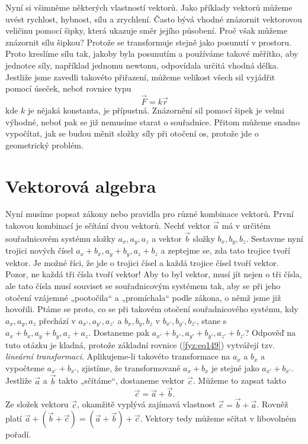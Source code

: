     Nyní si všimněme některých vlastností vektorů. Jako příklady vektorů můžeme uvést rychlost, 
    hybnost, sílu a zrychlení. Často bývá vhodné znázornit vektorovou veličinu pomocí šipky, která 
    ukazuje směr jejího působení. Proč však můžeme znázornit sílu šipkou? Protože se transformuje 
    stejně jako posunutí v prostoru. Proto kreslíme sílu tak, jakoby byla posunutím a používáme 
    takové měřítko, aby jednotce síly, například jednomu newtonu, odpovídala určitá vhodná délka. 
    Jestliže jsme zavedli takovéto přiřazení, můžeme velikost všech sil vyjádřit pomocí úseček, 
    neboť rovnice typu
    \begin{equation*}
     \vec{F} = k\vec{r}
    \end{equation*}
    kde \(k\) je nějaká konstanta, je přípustná. Znázornění sil pomocí šipek je velmi výhodné, 
    neboť pak se již nemusíme starat o souřadnice. Přitom můžeme snadno vypočítat, jak se budou 
    měnit složky síly při otočení os, protože jde o geometrický problém.
    
  \section{Vektorová algebra}\label{fyz:IchapXIsecIV}
    Nyní musíme popsat zákony nebo pravidla pro různé kombinace vektorů. První takovou kombinací je 
    sčítání dvou vektorů. Nechť vektor \(\vec{a}\) má v určitém souřadnicovém systému složky \(a_x, 
    a_y, a_z\) a vektor \(\vec{b}\) složky \(b_x, b_y, b_z\). Sestavme nyní trojici nových čísel 
    \(a_x + b_x, a_y + b_y, a_z + b_z\) a zeptejme se, zda tato trojice tvoří vektor. Je možné 
    říci, že jde o trojici čísel a každá trojice čísel tvoří vektor. Pozor, ne každá tři čísla 
    tvoří vektor! Aby to byl vektor, musí jít nejen o tři čísla, ale tato čísla musí souviset se 
    souřadnicovým systémem tak, aby se při jeho otočení vzájemné „pootočila“ a „promíchala“ podle 
    zákona, o němž jsme již hovořili. Ptáme se proto, co se při takovém otočení souřadnicového 
    systému, kdy \(a_x, a_y, a_z\) přechází v \(a_{x'}, a_{y'}, a_{z'}\) a \(b_x, b_y, b_z\) v 
    \(b_{x'}, b_{y'}, b_{z'}\), stane s \(a_x + b_x, a_y + b_y, a_z + a_z\). Dostaneme pak \(a_{x'} 
    + b_{x'}, a_{y'} + b_{y'}, a_{z'} + b_{z'}\)? Odpověď na tuto otázku je kladná, protože 
    základní rovnice (\ref{fyz:eq149}) vytvářejí tzv. \emph{lineární transformaci}. Aplikujeme-li 
    takovéto transformace na \(a_x\) a \(b_x\) a vypočteme \(a_{x'} + b_{x'}\), zjistíme, že 
    transformované \(a_x + b_x\) je stejné jako \(a_{x'} + b_{x'}\). Jestliže \(\vec{a}\) a 
    \(\vec{b}\) takto „sčítáme“, dostaneme vektor \(\vec{c}\). Můžeme to zapsat takto
    \begin{equation*}
     \vec{c} = \vec{a} + \vec{b}.
    \end{equation*}
    Ze složek vektoru \(\vec{c}\), okamžitě vyplývá zajímavá vlastnost \(\vec{c} = \vec{b} + 
    \vec{a}\). Rovněž platí \(\vec{a} + (\vec{b} + \vec{c}) = (\vec{a} + \vec{b}) + \vec{c}\). 
    Vektory tedy můžeme sčítat v libovolném pořadí.
    
